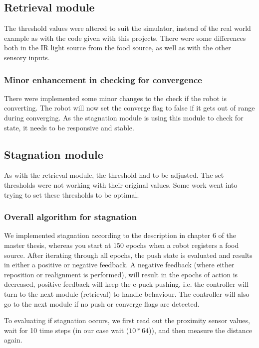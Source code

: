 \subsection{Retrieval module}
The threshold values were altered to suit the simulator, instead of the real world example as with the code given with this projects. There were some differences both in the IR light source from the food source, as well as with the other sensory inputs. 

\subsubsection{Minor enhancement in checking for convergence}
There were implemented some minor changes to the check if the robot is converting. The robot will now set the converge flag to false if it gets out of range during converging. As the stagnation module is using this module to check for state, it needs to be responsive and stable. 

\subsection{Stagnation module} 

As with the retrieval module, the threshold had to be adjusted. The set thresholds were not working with their original values. Some work went into trying to set these thresholds to be optimal.  

\subsubsection{Overall algorithm for stagnation}
We implemented stagnation according to the description in chapter 6 of the master thesis\cite{master}, whereas you start at 150 epochs when a robot registers a food source. After iterating through all epochs, the push state is evaluated and results in either a positive or negative feedback. A negative feedback (where either reposition or realignment is performed), will result in the epochs of action is decreased, positive feedback will keep the e-puck pushing, i.e. the controller will turn to the next module (retrieval) to handle behaviour. The controller will also go to the next module if no push or converge flags are detected. 

To evaluating if stagnation occurs, we first read out the proximity sensor values, wait for 10 time steps (in our case wait ($10 * 64$)), and then measure the distance again. 

